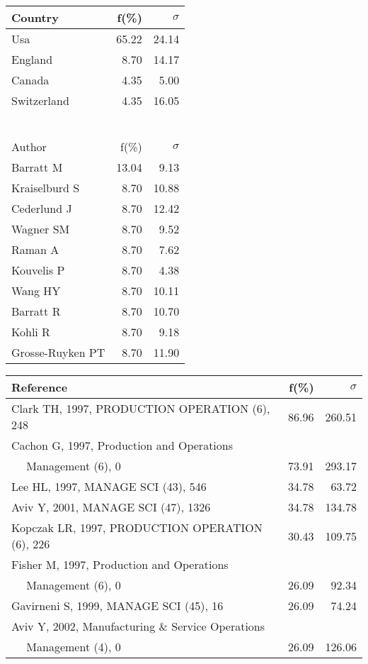 \documentclass[a4paper,11pt]{report}
\begin{document}
\begin{landscape}
\begin{table}[!ht]
{\begin{tabular}{|l r r|}
\hline
\hline
Country & f(\%) & $\sigma$\\
\hline
Usa & 65.22 & 24.14\\
England & 8.70 & 14.17\\
Canada & 4.35 & 5.00\\
Switzerland & 4.35 & 16.05\\
 &  & \\
 &  & \\
 &  & \\
 &  & \\
 &  & \\
 &  & \\
\hline
\hline
Author & f(\%) & $\sigma$\\
\hline
Barratt M & 13.04 & 9.13\\
Kraiselburd S & 8.70 & 10.88\\
Cederlund J & 8.70 & 12.42\\
Wagner SM & 8.70 & 9.52\\
Raman A & 8.70 & 7.62\\
Kouvelis P & 8.70 & 4.38\\
Wang HY & 8.70 & 10.11\\
Barratt R & 8.70 & 10.70\\
Kohli R & 8.70 & 9.18\\
Grosse-Ruyken PT & 8.70 & 11.90\\
\hline
\end{tabular}
}
{\scriptsize\begin{tabular}{|l r r|}
\hline
Reference & f(\%) & $\sigma$\\
\hline
Clark TH, 1997, PRODUCTION OPERATION (6), 248 & 86.96 & 260.51\\
Cachon G, 1997, Production and Operations &  & \\
$\quad$ Management (6), 0 & 73.91 & 293.17\\
Lee HL, 1997, MANAGE SCI (43), 546 & 34.78 & 63.72\\
Aviv Y, 2001, MANAGE SCI (47), 1326 & 34.78 & 134.78\\
Kopczak LR, 1997, PRODUCTION OPERATION (6), 226 & 30.43 & 109.75\\
Fisher M, 1997, Production and Operations &  & \\
$\quad$ Management (6), 0 & 26.09 & 92.34\\
Gavirneni S, 1999, MANAGE SCI (45), 16 & 26.09 & 74.24\\
Aviv Y, 2002, Manufacturing \& Service Operations &  & \\
$\quad$ Management (4), 0 & 26.09 & 126.06\\

\end{tabular}}
\end{table}
\end{landscape}
\end{document}

